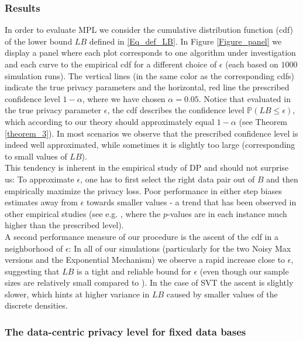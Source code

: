 \documentclass[conference]{IEEEtran}
\begin{document}
\subsubsection*{\textbf{Results}} 
In order to evaluate MPL we consider the cumulative distribution function (cdf) of the lower bound $LB$ defined in \eqref{Eq_def_LB}. In Figure \ref{Figure_panel} we display a panel where each plot corresponds to one algorithm under investigation and each curve to the empirical cdf for a different choice of $\epsilon$ (each based on $1000$ simulation runs). The vertical lines (in the same color as the corresponding cdfs) indicate the true privacy parameters and the horizontal, red line the prescribed confidence level $1-\alpha$, where we have chosen $\alpha = 0.05$. Notice that evaluated in the true privacy parameter $\epsilon$, the cdf describes the confidence level $\mathbb{P}(LB \le \epsilon)$, which according to our theory should approximately equal $1-\alpha$ (see Theorem \ref{theorem_3}). In most scenarios we observe that the prescribed confidence level is indeed well approximated, while sometimes it is slightly too large (corresponding to small values of $LB$).\\
This tendency is inherent in the empirical study of DP and should not surprise us: To approximate $\epsilon$, one has to first select the right data pair out of $B$ and then empirically maximize the privacy loss. Poor performance in either step biases estimates away from $\epsilon$ towards smaller values - a trend that has been observed in other empirical studies (see e.g. \cite{StatDP}, where the $p$-values are in each instance much higher than the prescribed level). \\
A second performance measure of our procedure is the ascent of the cdf in a neighborhood of $\epsilon$: In all of our simulations (particularly for the two Noisy Max versions and the Exponential Mechanism) we observe a rapid increase close to $\epsilon$, suggesting that $LB$ is a tight and reliable bound for $\epsilon$ (even though our sample sizes are relatively small compared to \cite{StatDP}). In the case of SVT the ascent is slightly slower, which hints at higher variance in $LB$ caused by smaller values of the discrete densities.




\subsubsection*{\textbf{The data-centric privacy level for fixed data bases}} 
\end{document}
